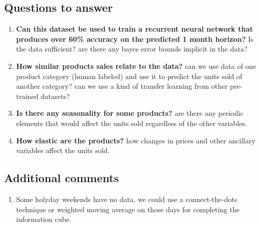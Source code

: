 \documentclass[]{article}
\providecommand{\tightlist}{%
  \setlength{\itemsep}{0pt}\setlength{\parskip}{0pt}}
\theoremstyle{definition}
\theoremstyle{definition}
\theoremstyle{definition}
\theoremstyle{remark}
\begin{document}
\subsection{Questions to answer}\label{questions-to-answer}

\begin{enumerate}
\def\labelenumi{\arabic{enumi}.}
\tightlist
\item
  \textbf{Can this dataset be used to train a recurrent neural network
  that produces over 60\% accuracy on the predicted 1 month horizon?} Is
  the data sufficient? are there any bayes error bounds implicit in the
  data?
\item
  \textbf{How similar products sales relate to the data?} can we use
  data of one product category (human labeled) and use it to predict the
  units sold of another category? can we use a kind of transfer learning
  from other pre-trained datasets?
\item
  \textbf{Is there any seasonality for some products?} are there any
  periodic elements that would affect the units sold regardless of the
  other variables.
\item
  \textbf{How elastic are the products?} how changes in prices and other
  ancillary variables affect the units sold.
\end{enumerate}

\subsection{Additional comments}\label{additional-comments}

\begin{enumerate}
\def\labelenumi{\arabic{enumi}.}
\tightlist
\item
  Some holyday weekends have no data, we could use a connect-the-dots
  technique or weighted moving average on those days for completing the
  information cube.
\end{enumerate}
\end{document}
